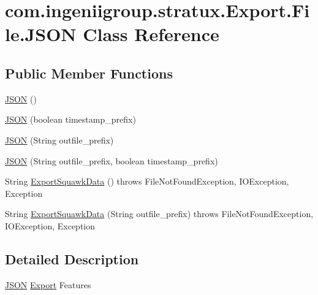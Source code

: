 \hypertarget{classcom_1_1ingeniigroup_1_1stratux_1_1_export_1_1_file_1_1_j_s_o_n}{}\section{com.\+ingeniigroup.\+stratux.\+Export.\+File.\+J\+S\+ON Class Reference}
\label{classcom_1_1ingeniigroup_1_1stratux_1_1_export_1_1_file_1_1_j_s_o_n}
\subsection*{Public Member Functions}
\begin{DoxyCompactItemize}
\item 
\hyperlink{classcom_1_1ingeniigroup_1_1stratux_1_1_export_1_1_file_1_1_j_s_o_n_a191db285aa2a014a6b1150d4d9cc8e7e}{J\+S\+ON} ()
\item 
\hyperlink{classcom_1_1ingeniigroup_1_1stratux_1_1_export_1_1_file_1_1_j_s_o_n_a85b48a540a9ae163160311d45c714b09}{J\+S\+ON} (boolean timestamp\+\_\+prefix)
\item 
\hyperlink{classcom_1_1ingeniigroup_1_1stratux_1_1_export_1_1_file_1_1_j_s_o_n_a65aeec6141f3206e10d16a7d4b5af165}{J\+S\+ON} (String outfile\+\_\+prefix)
\item 
\hyperlink{classcom_1_1ingeniigroup_1_1stratux_1_1_export_1_1_file_1_1_j_s_o_n_ad66992f9478a7ecdf0c9332a80488657}{J\+S\+ON} (String outfile\+\_\+prefix, boolean timestamp\+\_\+prefix)
\item 
String \hyperlink{classcom_1_1ingeniigroup_1_1stratux_1_1_export_1_1_file_1_1_j_s_o_n_ade92e71a88c4671c170c7ccc2c74a57b}{Export\+Squawk\+Data} ()  throws File\+Not\+Found\+Exception, I\+O\+Exception, Exception 
\item 
String \hyperlink{classcom_1_1ingeniigroup_1_1stratux_1_1_export_1_1_file_1_1_j_s_o_n_a87734bd945620c9b18ab1edfae32d336}{Export\+Squawk\+Data} (String outfile\+\_\+prefix)  throws File\+Not\+Found\+Exception, I\+O\+Exception, Exception 
\end{DoxyCompactItemize}


\subsection{Detailed Description}
\hyperlink{classcom_1_1ingeniigroup_1_1stratux_1_1_export_1_1_file_1_1_j_s_o_n}{J\+S\+ON} \hyperlink{namespacecom_1_1ingeniigroup_1_1stratux_1_1_export}{Export} Features

